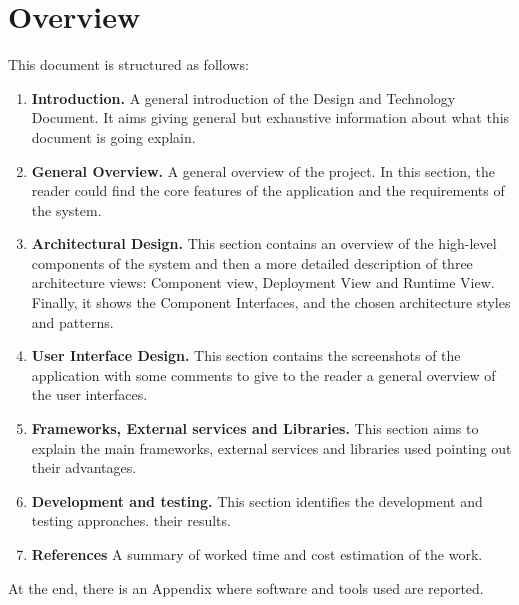 \documentclass[../../dd.tex]{subfiles}
\begin{document}
    \section{Overview}
    This document is structured as follows:
    \begin{enumerate}
        \item \textbf{Introduction.} A general introduction of the Design and Technology Document.
        It aims giving general but exhaustive information
        about what this document is going explain.
        \item \textbf{General Overview.} A general overview of the project.
        In this section, the reader could find the core features of the application and
        the requirements of the system.
        \item \textbf{Architectural Design.} This section contains an overview
        of the high-level components of the system and then a more detailed
        description of three architecture views: Component view, Deployment
        View and Runtime View.
        Finally, it shows the Component Interfaces, and the chosen architecture styles and patterns.
        \item \textbf{User Interface Design.} This section contains the screenshots
        of the application with some comments to give to the reader a general
        overview of the user interfaces.
        \item \textbf{Frameworks, External services and Libraries.} This section
        aims to explain the main frameworks, external services and libraries
        used pointing out their advantages.
        \item \textbf{Development and testing.} This section identifies the development and testing approaches.
        their results.
        \item \textbf{References} A summary of worked time and
        cost estimation of the work.
    \end{enumerate}

    At the end, there is an Appendix where software and tools used are reported.
\end{document}
